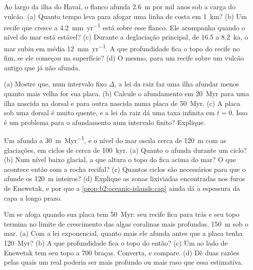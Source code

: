 \begin{exercise}[$\star\star$]\label{exo:b2:oceanic-islands:9}
Ao largo da ilha do Havaí, o flanco afunda \qty{2.6}{m} por mil anos sob a carga do
vulcão. (a) Quanto tempo leva para afogar uma linha de costa em \qty{1}{km}? (b) Um recife que cresce a
\qty{4.2}{mm.yr^{-1}} está sobre esse flanco. Ele acompanha quando o nível do mar está estável? (c) Durante a
deglaciação principal, de 16.5 a \qty{8.2}{ka}, o mar subiu em média \qty{12}{mm.yr^{-1}}. A que
profundidade fica o topo do recife no fim, se ele começou na superfície? (d) O mesmo, para um recife sobre
um vulcão antigo que já não afunda.
\end{exercise}

\begin{exercise}[$\star\star\star$]\label{exo:b2:oceanic-islands:10}
(a) Mostre que, num intervalo fixo $\Delta$, a lei da raiz faz uma ilha afundar menos quanto mais velha for sua
placa. (b) Calcule o afundamento em \qty{20}{Myr} para uma ilha nascida na dorsal e para outra nascida
numa placa de \qty{50}{Myr}. (c) A placa sob uma dorsal é muito quente, e a lei da raiz dá uma
taxa infinita em $t = 0$. Isso é um problema para o afundamento num intervalo finito? Explique.
\end{exercise}

\begin{exercise}[$\star\star\star$]\label{exo:b2:oceanic-islands:11}
Um  afunda a \qty{30}{m.Myr^{-1}}, e o nível do mar oscila cerca de \qty{120}{m} com as
glaciações, em ciclos de cerca de \qty{100}{kyr}. (a) Quanto o  afunda durante um ciclo? (b) Num
nível baixo glacial, a que altura o topo do  fica acima do mar? O que acontece então com a
rocha recifal? (c) Quantos ciclos são necessários para que o  afunde os \qty{120}{m} inteiros?
(d) Explique as zonas lixiviadas encontradas nos furos de Enewetak, e por que a
\cref{prop:b2:oceanic-islands:cap} ainda dá a espessura da capa a longo prazo.
\end{exercise}

\begin{exercise}[$\star\star\star$]\label{exo:b2:oceanic-islands:12}
Um  se afoga quando sua placa tem \qty{50}{Myr}: seu recife fica para trás e seu topo termina no
limite de crescimento das algas coralinas mais profundas, \qty{150}{m} sob o mar. (a) Com a lei
exponencial, quanto mais ele afunda antes que a placa tenha \qty{120}{Myr}? (b) A que profundidade fica o topo
do  então? (c) Um  ao lado de Enewetak tem seu topo a 700 braças. Converta, e compare.
(d) Dê duas razões pelas quais um  real poderia ser mais profundo ou mais raso que essa estimativa.
\end{exercise}

